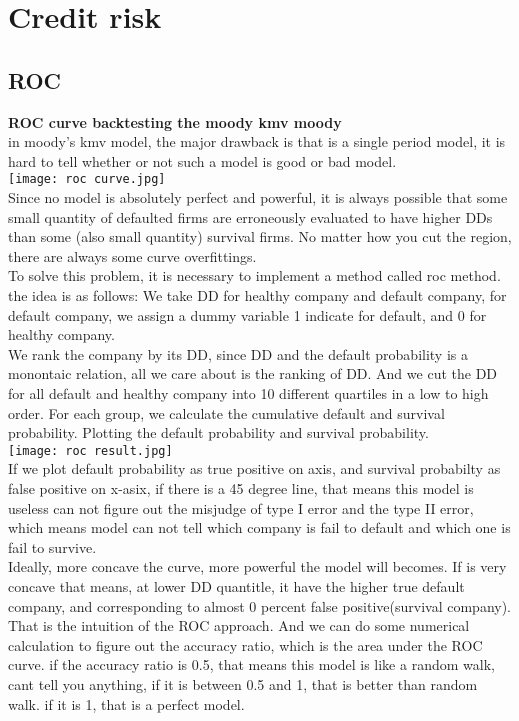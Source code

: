 \documentclass[a4paper,11pt]{article}
\begin{document}
\section{Credit risk}
\subsection{ROC}
{\bf ROC curve backtesting the moody kmv moody}\\
in moody's kmv model, the major drawback is that is a single period model,
it is hard to tell whether or not such a model is good or bad model.\\
\texttt{[image: roc curve.jpg]}\\

Since no model is absolutely perfect and powerful, it is always possible that some small
quantity of defaulted firms are erroneously evaluated to have higher DDs than some (also
small quantity) survival firms. No matter how you cut the region, there
are always some curve overfittings. \\
To solve this problem, it is necessary to implement a method called roc method. the idea
is as follows: We take DD for healthy company and default company, for default company,
we assign a dummy variable 1 indicate for default, and 0 for healthy company.\\
We rank the company by its DD, since DD and the default probability is a monontaic relation,
all we care about is the ranking of DD. And we cut the DD for all default and healthy company
into 10 different quartiles in a low to high order. For each group, we calculate the cumulative
default and survival probability. Plotting the default probability and survival probability. \\
\texttt{[image: roc result.jpg]}\\
If we plot default probability as true positive on axis, and survival probabilty as false positive on x-asix,
if there is a 45 degree line, that means this model is useless can not figure out the misjudge of type I error
and the type II error, which means model can not tell which company is fail to default and which one is fail to
survive. \\
Ideally, more concave the curve, more powerful the model will becomes. If is very concave that means, at lower DD quantitle, it have the higher true default company, and corresponding to almost 0 percent false positive(survival company). That is the intuition of the ROC approach. And we can do some numerical calculation to figure out the accuracy ratio, which is the area under the ROC curve. if the accuracy ratio is 0.5, that means this model is like
a random walk, cant tell you anything, if it is between 0.5 and 1, that is better than random walk. if it is 1, that
is a perfect model.\\
\end{document}
